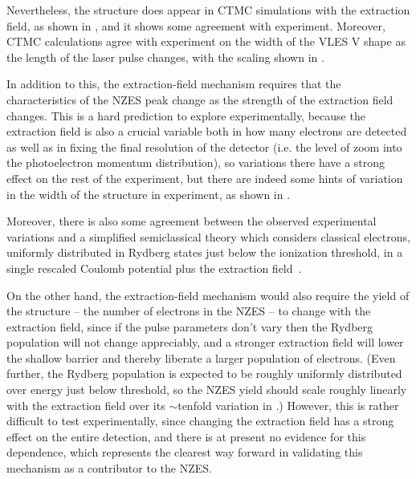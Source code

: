 Nevertheless, the structure does appear in CTMC simulations with the extraction field, as shown in , and it shows some agreement with experiment. Moreover, CTMC calculations agree with experiment on the width of the VLES V shape as the length of the laser pulse changes, with the scaling shown in .



In addition to this, the extraction-field mechanism requires that the characteristics of the NZES peak change as the strength of the extraction field changes. This is a hard prediction to explore experimentally, because the extraction field is also a crucial variable both in how many electrons are detected as well as in fixing the final resolution of the detector (i.e. the level of zoom into the photoelectron momentum distribution), so variations there have a strong effect on the rest of the experiment, but there are indeed some hints of variation in the width of the structure in experiment, as shown in . 

Moreover, there is also some agreement between the observed experimental variations and a simplified semiclassical theory which considers classical electrons, uniformly distributed in Rydberg states just below the ionization threshold, in a single rescaled Coulomb potential plus the extraction field~\cite{Rost_latest}.

On the other hand, the extraction-field mechanism would also require the yield of the structure -- the number of electrons in the NZES -- to change with the extraction field, since if the pulse parameters don't vary then the Rydberg population will not change appreciably, and a stronger extraction field will lower the shallow barrier and thereby liberate a larger population of electrons. (Even further, the Rydberg population is expected to be roughly uniformly distributed over energy just below threshold, so the NZES yield should scale roughly linearly with the extraction field over its $\sim$tenfold variation in .) However, this is rather difficult to test experimentally, since changing the extraction field has a strong effect on the entire detection, and there is at present no evidence for this dependence, which represents the clearest way forward in validating this mechanism as a contributor to the NZES.


